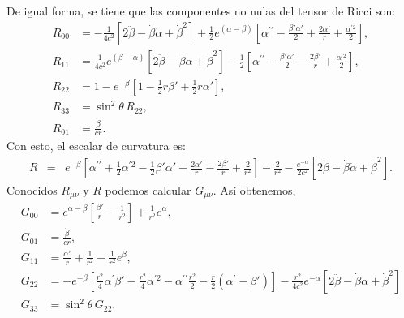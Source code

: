 De igual forma, se tiene que las componentes no nulas del tensor de Ricci son:
\begin{align}
R_{00} & =-\frac{1}{4c^2}\left[ 2\ddot{\beta}-\dot{\beta}\dot{\alpha}%
+\dot{\beta}^2\right] +\frac{1}2e^{(\alpha-\beta)}
\left[\alpha^{\prime\prime}-\frac{\beta'\alpha'}{2}+\frac{2\alpha'}%
{r}+\frac{\alpha^{\prime2}}2\right] \label{ricci00},\\
R_{11} & =\frac{1}{4c^2}e^{(\beta-\alpha)} \left[ 2\ddot{\beta}%
-\dot{\beta}\dot{\alpha}+\dot{\beta}^2\right] -\frac{1}2\left[
\alpha^{\prime\prime}-\frac{\beta'\alpha'}2-\frac{2\beta'%
}{r}+\frac{\alpha^{\prime2}}2\right] ,\label{ricci11}\\
R_{22} & =1-e^{-\beta} \left[ 1-\frac{1}2r\beta
'+\frac{1}2r\alpha'\right] ,\label{ricci22}\\
R_{33} & =\sin^2\theta\, R_{22} ,\label{ricci33}\\
R_{01} &= \frac{\dot{\beta}}{cr}.\label{ricci01}
\end{align}
Con esto, el escalar de curvatura es:
\begin{eqnarray}
R &=& e^{-\beta}\left[
\alpha^{\prime\prime}+\frac{1}{2}\alpha^{\prime2}-\frac{1}2\beta'\alpha'+\frac{
2\alpha'}{r}-\frac{2\beta'}{r} +\frac2{r^2}\right] -\frac2{r^2}
-\frac{e^{-\alpha}}{2c^2} \left[ 2\ddot{\beta}-\dot{\beta}%
\dot{\alpha}+\dot{\beta}^2\right].
\end{eqnarray}
Conocidos $R_{\mu\nu}$ y $R$ podemos calcular $G_{\mu\nu}$. Así obtenemos,
\begin{align}
G_{00} & =e^{\alpha-\beta}\left[ \frac{\beta'}{r}-\frac{1}{r^2}\right]
+\frac{1}{r^2}e^\alpha, \\
G_{01} &= \frac{\dot{\beta}}{cr},\label{g01b}\\
G_{11} &=\frac{\alpha'}{r}+\frac{1}{r^2}-\frac{1}{r^2}e^{\beta} ,\label{g11}\\
G_{22} & =-e^{-\beta} \left[ \frac{r^2}{4}\alpha^{\prime
}\beta'-\frac{r^2}{4}\alpha^{\prime2}-\alpha^{\prime\prime}\frac{r^2}{2}-\frac{r}{2}\left( \alpha^{\prime}-\beta'\right) \right] -\frac{r^2}{4c^2}e^{-\alpha}\left[2\ddot{\beta}-\dot{\beta}\dot{\alpha}
+\dot{\beta}^2\right] \\
G_{33} & =\sin^2\theta\, G_{22}.
\end{align}


